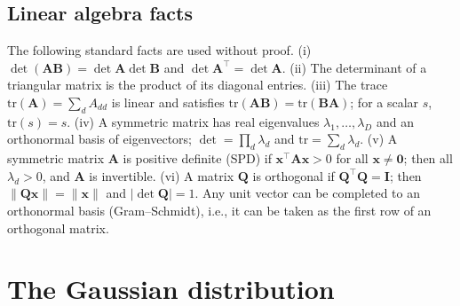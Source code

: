 \documentclass[11pt,a4paper]{article}
\numberwithin{equation}{section}
\theoremstyle{plain}
\theoremstyle{definition}
\theoremstyle{remark}
\newcommand{\x}{\mathbf{x}}
\newcommand{\Ab}{\mathbf{A}}
\newcommand{\Qb}{\mathbf{Q}}
\newcommand{\I}{\mathbf{I}}
\newcommand{\tr}{\mathrm{tr}}
\begin{document}
\subsection{Linear algebra facts}
\label{sec:linalg}
The following standard facts are used without proof.
(i) $\det(\Ab\mathbf B)=\det\Ab\det\mathbf B$ and $\det\Ab^\top=\det\Ab$.
(ii) The determinant of a triangular matrix is the product of its diagonal entries.
(iii) The trace $\tr(\Ab)=\sum_dA_{dd}$ is linear and satisfies $\tr(\Ab\mathbf B)=\tr(\mathbf B\Ab)$; for a scalar $s$, $\tr(s)=s$.
(iv) A symmetric matrix has real eigenvalues $\lambda_1,\dots,\lambda_D$ and an orthonormal basis of eigenvectors; $\det=\prod_d\lambda_d$ and $\tr=\sum_d\lambda_d$.
(v) A symmetric matrix $\Ab$ is positive definite (SPD) if $\x^\top\Ab\x>0$ for all $\x\neq\mathbf0$; then all $\lambda_d>0$, and $\Ab$ is invertible.
(vi) A matrix $\Qb$ is orthogonal if $\Qb^\top\Qb=\I$; then $\|\Qb\x\|=\|\x\|$ and $|\det\Qb|=1$. Any unit vector can be completed to an orthonormal basis (Gram--Schmidt), i.e., it can be taken as the first row of an orthogonal matrix.

\section{The Gaussian distribution}
\label{sec:gauss}
\end{document}
